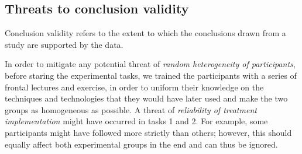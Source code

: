 \subsection{Threats to conclusion validity}
Conclusion validity refers to the extent to which the conclusions drawn from a study are supported by the data. 

In order to mitigate any potential threat of \textit{random heterogeneity of participants}, before staring the experimental tasks, we trained the participants with a series of frontal lectures and exercise, in order to uniform their knowledge on the techniques and technologies that they would have later used and make the two groups as homogeneous as possible. 
A threat of \textit{reliability of treatment implementation} might have occurred in tasks 1 and 2. For example, some participants might have followed \tdd more strictly than others; however, this should equally affect both experimental groups in the end and can thus be ignored. 
